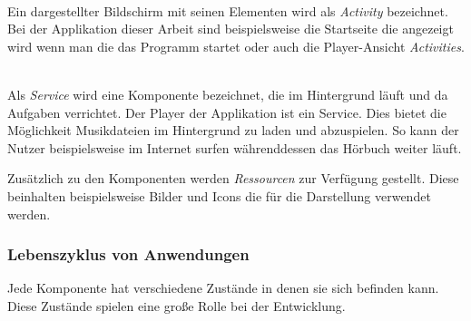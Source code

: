 \begin{description}[style=nextline]

	\item[Activities] \hfill \\
	Ein dargestellter Bildschirm mit seinen Elementen wird als \emph{Activity} bezeichnet. Bei der Applikation dieser Arbeit sind beispielsweise die Startseite die angezeigt wird wenn man die das Programm startet oder auch die Player-Ansicht \emph{Activities}.
	
	\item[Services] \hfill \\
	Als \emph{Service} wird eine Komponente bezeichnet, die im Hintergrund läuft und da Aufgaben verrichtet. Der Player der Applikation ist ein Service. Dies bietet die Möglichkeit Musikdateien im Hintergrund zu laden und abzuspielen. So kann der Nutzer beispielsweise im Internet surfen währenddessen das Hörbuch weiter läuft.
	
\end{description}

Zusätzlich zu den Komponenten werden \emph{Ressourcen} zur Verfügung gestellt. Diese beinhalten beispielsweise Bilder und Icons die für die Darstellung verwendet werden.

\subsubsection{Lebenszyklus von Anwendungen}

Jede Komponente hat verschiedene Zustände in denen sie sich befinden kann. Diese Zustände spielen eine große Rolle bei der Entwicklung. 

